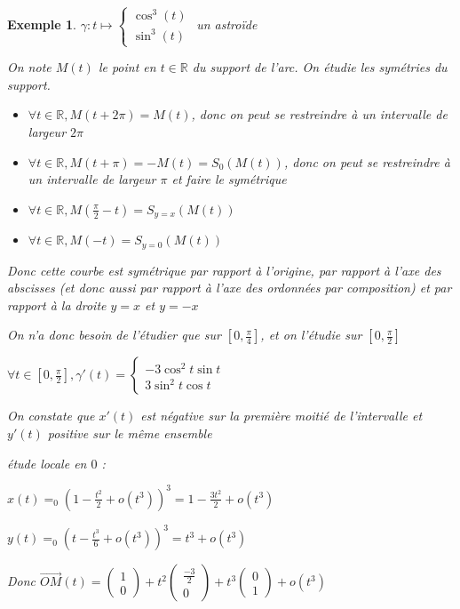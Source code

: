 \documentclass[a4paper,12pt]{book}
\newtheorem{Exe}{Exemple}[section]
\def\R{\mathbb{R}}
\begin{document}
\begin{Exe}
$\gamma:t\mapsto \left\{\begin{array}{c}\cos^3(t) \\\sin^3(t)\end{array}\right.$ un astroïde
\par On note $M(t)$ le point en $t\in\R$ du support de l'arc. On étudie les symétries du support.
\begin{itemize}
\item $\forall t\in\R, M(t+2\pi)=M(t)$, donc on peut se restreindre à un intervalle de largeur $2\pi$
\item $\forall t\in\R, M(t+\pi)=-M(t) = S_0(M(t))$, donc on peut se restreindre à un intervalle de largeur $\pi$ et faire le symétrique
\item $\forall t\in\R, M\left(\frac{\pi}{2}-t\right) = S_{y=x}(M(t))$
\item $\forall t\in\R, M(-t) = S_{y=0}(M(t))$
\end{itemize}
Donc cette courbe est symétrique par rapport à l'origine, par rapport à l'axe des abscisses (et donc aussi par rapport à l'axe des ordonnées par composition) et par rapport à la droite $y=x$ et $y=-x$
\par On n'a donc besoin de l'étudier que sur $\left[0, \frac{\pi}{4}\right]$, et on l'étudie sur $\left[0, \frac{\pi}{2}\right]$
\par $\forall t\in \left[0, \frac{\pi}{2}\right], \gamma'(t) = \left\{\begin{array}{c} -3\cos^2t\sin t \\3\sin^2t\cos t\end{array}\right.$
\par On constate que $x'(t)$ est négative sur la première moitié de l'intervalle et $y'(t)$ positive sur le même ensemble
\par étude locale en $0$ :
\par $x(t)=_0 (1-\frac{t^2}{2}+o(t^3))^3 = 1-\frac{3t^2}{2}+o(t^3)$
\par $y(t)=_0 (t-\frac{t^3}{6}+o(t^3))^3 = t^3 + o(t^3)$
\par Donc $\overrightarrow{OM}(t) = \begin{pmatrix} 1 \\ 0\end{pmatrix} + t^2\begin{pmatrix}\frac{-3}{2}\\ 0\end{pmatrix} + t^3\begin{pmatrix} 0 \\ 1\end{pmatrix}+o(t^3)$
\end{Exe}
\end{document}
